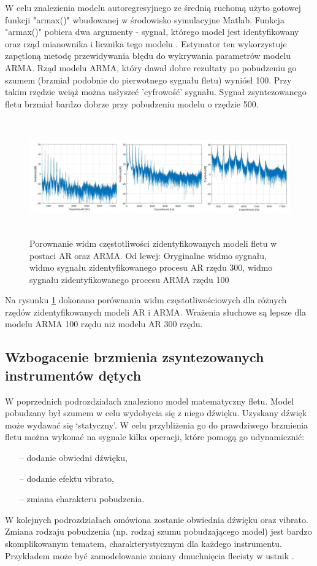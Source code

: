 W celu znalezienia modelu autoregresyjnego ze średnią ruchomą użyto gotowej funkcji "armax()" wbudowanej w środowisko symulacyjne Matlab. Funkcja "armax()" pobiera dwa argumenty - sygnał, którego model jest identyfikowany oraz rząd mianownika i licznika tego modelu \cite{armax}. Estymator ten wykorzystuje zapętloną metodę przewidywania błędu do wykrywania parametrów modelu ARMA. Rząd modelu ARMA, który dawał dobre rezultaty po pobudzeniu go szumem (brzmiał podobnie do pierwotnego sygnału fletu) wyniósł 100. Przy takim rzędzie wciąż można usłyszeć 'cyfrowość' sygnału. Sygnał zsyntezowanego fletu brzmiał bardzo dobrze przy pobudzeniu modelu o rzędzie 500.


\begin{figure}[H]
	\centering
	\includegraphics[width=12cm, height=5cm]{grafiki/Model_AR_300}
	\captionsetup{justification=centering}
	\caption{Porownanie widm częstotliwości zidentyfikowanych modeli fletu w postaci AR oraz ARMA. Od lewej: Oryginalne widmo sygnału, widmo sygnału zidentyfikowanego procesu AR rzędu 300, widmo sygnału zidentyfikowanego procesu ARMA rzędu 100}
	\label{rys:por_ar_arma}
\end{figure}
Na rysunku \ref{rys:por_ar_arma} dokonano porównania widm częstotliwościowych dla różnych rzędów zidentyfikowanych modeli AR i ARMA. Wrażenia słuchowe są lepsze dla modelu ARMA 100 rzędu niż modelu AR 300 rzędu.

\subsection{Wzbogacenie brzmienia zsyntezowanych instrumentów dętych}
W poprzednich podrozdziałach znaleziono model matematyczny fletu. Model pobudzany był szumem w celu wydobycia się z niego dźwięku. Uzyskany dźwięk może wydawać się ‘statyczny’. W celu przybliżenia go do prawdziwego brzmienia fletu można wykonać na sygnale kilka operacji, które pomogą go udynamicznić:
\begin{enumerate}
	\setlength\itemsep{-3pt}
	\item[--] dodanie obwiedni dźwięku,
	\item[--] dodanie efektu vibrato,
	\item[--] zmiana charakteru pobudzenia.
\end{enumerate}
W kolejnych podrozdziałach omówiona zostanie obwiednia dźwięku oraz vibrato. Zmiana rodzaju pobudzenia (np. rodzaj szumu pobudzającego model) jest bardzo skomplikowanym tematem, charakterystycznym dla każdego instrumentu. Przykładem może być zamodelowanie zmiany dmuchnięcia flecisty w ustnik \cite{gest_flute}.
